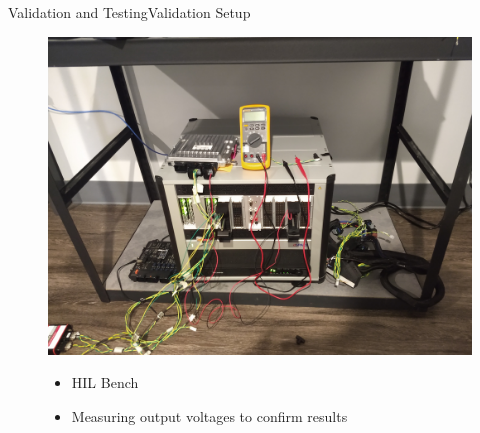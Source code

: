 \documentclass{beamer}
\begin{document}
\begin{frame}{Validation and Testing}{Validation Setup}
	\begin{figure}
		\centering	
		\begin{minipage}{.5\textwidth}
	  		\centering
	  		\includegraphics[width=.85\linewidth]{figs/img/picturesVisitToAStuff/hilBenchAstuff}
	  		\label{fig:test1}
		\end{minipage}%
		\begin{minipage}{.5\textwidth}
	  		\centering
	  		\begin{itemize} 
	  			\item HIL Bench
	  			\item Measuring output voltages to confirm results 
	  		\end{itemize}
		\end{minipage}
	\end{figure}
\end{frame}
\end{document}
